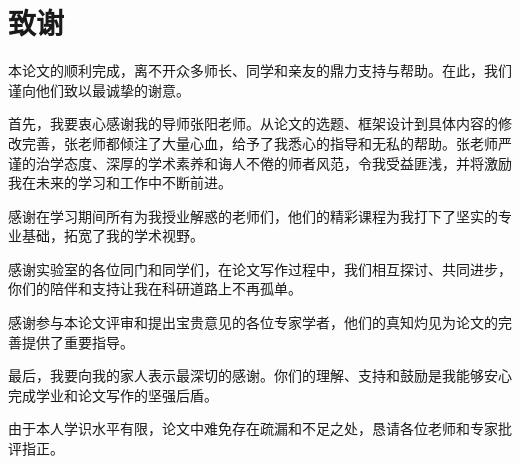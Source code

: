 \documentclass[12pt,a4paper]{ctexart}
\begin{document}
\clearpage
\thispagestyle{empty} 
\section*{致谢} %

本论文的顺利完成，离不开众多师长、同学和亲友的鼎力支持与帮助。在此，我们谨向他们致以最诚挚的谢意。

首先，我要衷心感谢我的导师张阳老师。从论文的选题、框架设计到具体内容的修改完善，张老师都倾注了大量心血，给予了我悉心的指导和无私的帮助。张老师严谨的治学态度、深厚的学术素养和诲人不倦的师者风范，令我受益匪浅，并将激励我在未来的学习和工作中不断前进。

感谢在学习期间所有为我授业解惑的老师们，他们的精彩课程为我打下了坚实的专业基础，拓宽了我的学术视野。

感谢实验室的各位同门和同学们，在论文写作过程中，我们相互探讨、共同进步，你们的陪伴和支持让我在科研道路上不再孤单。

感谢参与本论文评审和提出宝贵意见的各位专家学者，他们的真知灼见为论文的完善提供了重要指导。

最后，我要向我的家人表示最深切的感谢。你们的理解、支持和鼓励是我能够安心完成学业和论文写作的坚强后盾。

由于本人学识水平有限，论文中难免存在疏漏和不足之处，恳请各位老师和专家批评指正。

\end{document}
